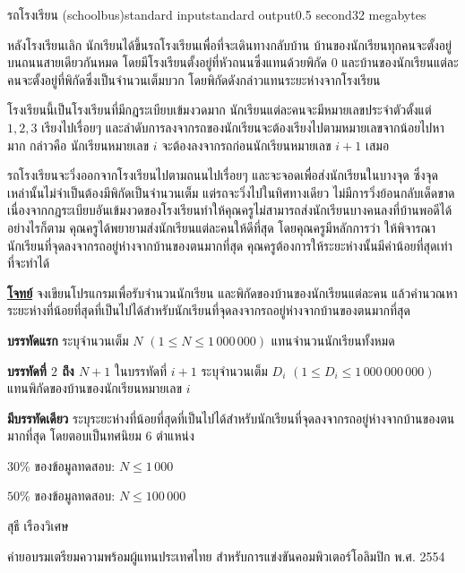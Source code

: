 \documentclass[11pt,a4paper]{article}
\begin{document}
\begin{problem}{รถโรงเรียน (schoolbus)}{standard input}{standard output}{0.5 second}{32 megabytes}

หลังโรงเรียนเลิก นักเรียนได้ขึ้นรถโรงเรียนเพื่อที่จะเดินทางกลับบ้าน บ้านของนักเรียนทุกคนจะตั้งอยู่บนถนนสายเดียวกันหมด โดยมีโรงเรียนตั้งอยู่ที่หัวถนนซึ่งแทนด้วยพิกัด $0$ และบ้านของนักเรียนแต่ละคนจะตั้งอยู่ที่พิกัดซึ่งเป็นจำนวนเต็มบวก โดยพิกัดดังกล่าวแทนระยะห่างจากโรงเรียน

โรงเรียนนี้เป็นโรงเรียนที่มีกฎระเบียบเข้มงวดมาก นักเรียนแต่ละคนจะมีหมายเลขประจำตัวตั้งแต่ $1, 2, 3$ เรียงไปเรื่อยๆ และลำดับการลงจากรถของนักเรียนจะต้องเรียงไปตามหมายเลขจากน้อยไปหามาก กล่าวคือ นักเรียนหมายเลข $i$ จะต้องลงจากรถก่อนนักเรียนหมายเลข $i+1$ เสมอ

รถโรงเรียนจะวิ่งออกจากโรงเรียนไปตามถนนไปเรื่อยๆ และจะจอดเพื่อส่งนักเรียนในบางจุด ซึ่งจุดเหล่านั้นไม่จำเป็นต้องมีพิกัดเป็นจำนวนเต็ม แต่รถจะวิ่งไปในทิศทางเดียว ไม่มีการวิ่งย้อนกลับเด็ดขาด เนื่องจากกฎระเบียบอันเข้มงวดของโรงเรียนทำให้คุณครูไม่สามารถส่งนักเรียนบางคนลงที่บ้านพอดีได้ อย่างไรก็ตาม คุณครูได้พยายามส่งนักเรียนแต่ละคนให้ดีที่สุด โดยคุณครูมีหลักการว่า ให้พิจารณานักเรียนที่จุดลงจากรถอยู่ห่างจากบ้านของตนมากที่สุด คุณครูต้องการให้ระยะห่างนั้นมีค่าน้อยที่สุดเท่าที่จะทำได้

\bigskip
\underline{\textbf{โจทย์}}  จงเขียนโปรแกรมเพื่อรับจำนวนนักเรียน และพิกัดของบ้านของนักเรียนแต่ละคน แล้วคำนวณหาระยะห่างที่น้อยที่สุดที่เป็นไปได้สำหรับนักเรียนที่จุดลงจากรถอยู่ห่างจากบ้านของตนมากที่สุด


\InputFile

\textbf{บรรทัดแรก} ระบุจำนวนเต็ม $N$ $(1 \leq N \leq 1\,000\,000)$ แทนจำนวนนักเรียนทั้งหมด

\textbf{บรรทัดที่ $2$ ถึง $N+1$ }ในบรรทัดที่ $i+1$ ระบุจำนวนเต็ม $D_i$ $(1 \leq D_i \leq 1\,000\,000\,000)$ แทนพิกัดของบ้านของนักเรียนหมายเลข $i$


\OutputFile

\textbf{มีบรรทัดเดียว} ระบุระยะห่างที่น้อยที่สุดที่เป็นไปได้สำหรับนักเรียนที่จุดลงจากรถอยู่ห่างจากบ้านของตนมากที่สุด โดยตอบเป็นทศนิยม $6$ ตำแหน่ง

\Examples

\begin{example}
%
%
\end{example}

\Scoring

$30$\% ของข้อมูลทดสอบ: $N \leq 1\,000$

$50$\% ของข้อมูลทดสอบ: $N \leq 100\,000$

\Source

สุธี เรืองวิเศษ

ค่ายอบรมเตรียมความพร้อมผู้แทนประเทศไทย สำหรับการแข่งขันคอมพิวเตอร์โอลิมปิก พ.ศ. 2554

\end{problem}
\end{document}
